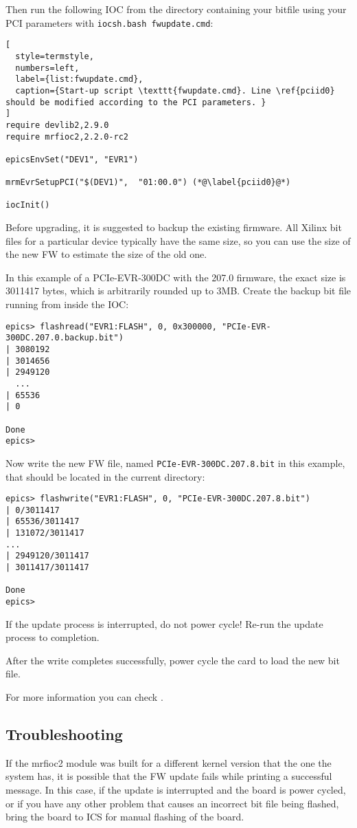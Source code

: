 \documentclass[11pt
  , a4paper
  , article
  , oneside
  , showtrims
]{memoir}
\begin{document}
Then run the following IOC from the directory containing your bitfile using your PCI parameters with \texttt{iocsh.bash fwupdate.cmd}:
\begin{lstlisting}[
  style=termstyle,
  numbers=left,
  label={list:fwupdate.cmd},
  caption={Start-up script \texttt{fwupdate.cmd}. Line \ref{pciid0} should be modified according to the PCI parameters. }
]
require devlib2,2.9.0
require mrfioc2,2.2.0-rc2

epicsEnvSet("DEV1", "EVR1")

mrmEvrSetupPCI("$(DEV1)",  "01:00.0") (*@\label{pciid0}@*)

iocInit()

\end{lstlisting}

Before upgrading, it is suggested to backup the existing firmware. All Xilinx bit files for a particular device typically have the same size, so you can use the size of the new FW to estimate the size of the old one.

In this example of a PCIe-EVR-300DC with the 207.0 firmware, the exact size is 3011417 bytes, which is arbitrarily rounded up to 3MB. Create the backup bit file running from inside the IOC:
\begin{lstlisting}[style=termstyle]
epics> flashread("EVR1:FLASH", 0, 0x300000, "PCIe-EVR-300DC.207.0.backup.bit")
| 3080192
| 3014656
| 2949120
  ...
| 65536
| 0

Done
epics>
\end{lstlisting}

Now write the new FW file, named \texttt{PCIe-EVR-300DC.207.8.bit} in this example, that should be located in the current directory:
\begin{lstlisting}[style=termstyle]
epics> flashwrite("EVR1:FLASH", 0, "PCIe-EVR-300DC.207.8.bit")
| 0/3011417
| 65536/3011417
| 131072/3011417
...
| 2949120/3011417
| 3011417/3011417

Done
epics>
\end{lstlisting}

If the update process is interrupted, do not power cycle! Re-run the update process to completion.

After the write completes successfully, power cycle the card to load the new bit file.

For more information you can check \citep[section Firmware Update, PCIe-EVR-300DC, mTCA-EVR-300]{EVRUSAGEGUIDE}.


\subsection{Troubleshooting}
If the mrfioc2 module was built for a different kernel version that the one the system has, it is possible that the FW update fails while printing a successful message. In this case, if the update is interrupted and the board is power cycled, or if you have any other problem that causes an incorrect bit file being flashed, bring the board to ICS for manual flashing of the board.
\end{document}
